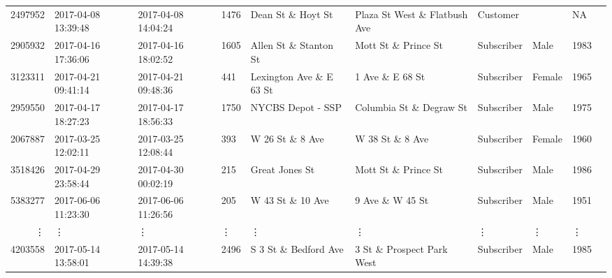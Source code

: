 \documentclass[11pt]{article}
\begin{document}
\begin{description}
\begin{tabular}{r|lllllllll}
	 2497952                          & 2017-04-08 13:39:48              & 2017-04-08 14:04:24              & 1476                             & Dean St \& Hoyt St              & Plaza St West \& Flatbush Ave   & Customer                         &                                  &   NA                            \\
	 2905932                          & 2017-04-16 17:36:06              & 2017-04-16 18:02:52              & 1605                             & Allen St \& Stanton St          & Mott St \& Prince St            & Subscriber                       & Male                             & 1983                            \\
	 3123311                          & 2017-04-21 09:41:14              & 2017-04-21 09:48:36              &  441                             & Lexington Ave \& E 63 St        & 1 Ave \& E 68 St                & Subscriber                       & Female                           & 1965                            \\
	 2959550                          & 2017-04-17 18:27:23              & 2017-04-17 18:56:33              & 1750                             & NYCBS Depot - SSP                & Columbia St \& Degraw St        & Subscriber                       & Male                             & 1975                            \\
	 2067887                          & 2017-03-25 12:02:11              & 2017-03-25 12:08:44              &  393                             & W 26 St \& 8 Ave                & W 38 St \& 8 Ave                & Subscriber                       & Female                           & 1960                            \\
	 3518426                          & 2017-04-29 23:58:44              & 2017-04-30 00:02:19              &  215                             & Great Jones St                   & Mott St \& Prince St            & Subscriber                       & Male                             & 1986                            \\
	 5383277                          & 2017-06-06 11:23:30              & 2017-06-06 11:26:56              &  205                             & W 43 St \& 10 Ave               & 9 Ave \& W 45 St                & Subscriber                       & Male                             & 1951                            \\
	 ⋮ & ⋮ & ⋮ & ⋮ & ⋮ & ⋮ & ⋮ & ⋮ & ⋮\\
	 4203558                       & 2017-05-14 13:58:01           & 2017-05-14 14:39:38           & 2496                          & S 3 St \& Bedford Ave        & 3 St \& Prospect Park West   & Subscriber                    & Male                          & 1985                         \\

\end{tabular}
\end{description}
\end{document}

